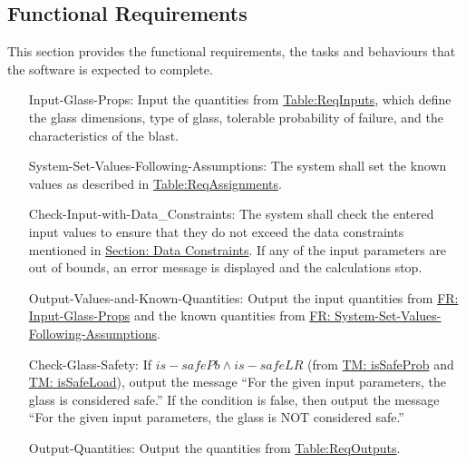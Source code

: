 \documentclass[12pt]{article}
\begin{document}
\subsection{Functional Requirements}
\label{Sec:FRs}
This section provides the functional requirements, the tasks and behaviours that the software is expected to complete.
\begin{itemize}
\item[Input-Glass-Props:\phantomsection\label{inputGlassProps}]{Input the quantities from \hyperref[Table:ReqInputs]{Table:ReqInputs}, which define the glass dimensions, type of glass, tolerable probability of failure, and the characteristics of the blast.}
\item[System-Set-Values-Following-Assumptions:\phantomsection\label{sysSetValsFollowingAssumps}]{The system shall set the known values as described in \hyperref[Table:ReqAssignments]{Table:ReqAssignments}.}
\item[Check-Input-with-Data\_Constraints:\phantomsection\label{checkInputWithDataCons}]{The system shall check the entered input values to ensure that they do not exceed the data constraints mentioned in \hyperref[Sec:DataConstraints]{Section: Data Constraints}. If any of the input parameters are out of bounds, an error message is displayed and the calculations stop.}
\item[Output-Values-and-Known-Quantities:\phantomsection\label{outputValsAndKnownQuants}]{Output the input quantities from \hyperref[inputGlassProps]{FR: Input-Glass-Props} and the known quantities from \hyperref[sysSetValsFollowingAssumps]{FR: System-Set-Values-Following-Assumptions}.}
\item[Check-Glass-Safety:\phantomsection\label{checkGlassSafety}]{If $is-safePb\land{}is-safeLR$ (from \hyperref[TM:isSafeProb]{TM: isSafeProb} and \hyperref[TM:isSafeLoad]{TM: isSafeLoad}), output the message ``For the given input parameters, the glass is considered safe.'' If the condition is false, then output the message ``For the given input parameters, the glass is NOT considered safe.''}
\item[Output-Quantities:\phantomsection\label{outputQuants}]{Output the quantities from \hyperref[Table:ReqOutputs]{Table:ReqOutputs}.}
\end{itemize}
\end{document}
